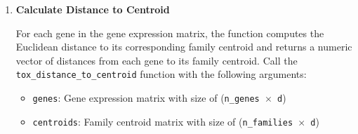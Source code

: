 \begin{enumerate}
    \textbf{Mathematical Definition:}
    \[ \text{shift\_vector} = \text{expression\_vector} - \text{family\_centroid} \]
    
    \textbf{Arguments:}
    \begin{itemize}
        \item \texttt{expression\_vectors}: Matrix of size \texttt{(n\_axes\_genes × n\_vectors)} where each column is a gene expression vector
        \item \texttt{family\_centroids}: Matrix of size \texttt{(n\_axes\_centroids × n\_families)} where each column is a family centroid vector
        \item \texttt{gene\_to\_centroid}: Integer vector of length \texttt{n\_vectors} containing 1-based family indices mapping each gene to its centroid
    \end{itemize}
    \textbf{Returns:}
    \begin{itemize}
        \item \texttt{shift\_vectors}: Matrix of size \texttt{(2*n\_axes\_genes × n\_vectors)} containing centroids (rows 1:n\_axes\_genes) and shift vectors (rows (n\_axes\_genes+1):(2*n\_axes\_genes))
    \end{itemize}
    \begin{lstlisting}[language=R, caption={R Shift Vector Field Computation}]
shift_vectors <- tox_compute_shift_vector_field(expression_vectors, 
    family_centroids, gene_to_centroid)
    \end{lstlisting}          
    
    \item \textbf{Calculate Distance to Centroid}
          
          For each gene in the gene expression matrix, the function computes the
          Euclidean distance to its corresponding family centroid and returns a
          numeric vector of distances from each gene to its family centroid. Call the
          \texttt{tox\_distance\_to\_centroid} function with the following arguments:
          
          \begin{itemize}
            \item \texttt{genes}: Gene expression matrix with size of (\texttt{n\_genes
                  $\times$ d})
            
            \item \texttt{centroids}: Family centroid matrix with size of (\texttt{n\_families
                  $\times$ d})
            

\end{itemize}
\end{enumerate}
